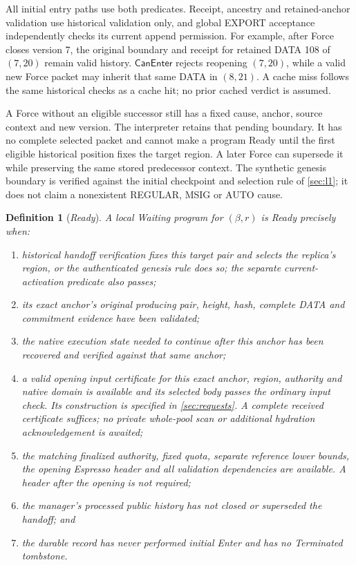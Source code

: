 \documentclass[11pt,a4paper]{article}
\newcommand{\tagg}[1]{\ensuremath{\mathsf{#1}}}
\newcommand{\defterm}[1]{\textcolor{rrBlue}{\textit{#1}}}
\newtheorem{definition}{Definition}[section]
\begin{document}
All initial entry paths use both predicates. Receipt, ancestry and
retained-anchor validation use historical validation only, and global
EXPORT acceptance independently checks its current append permission.
For example, after Force closes version 7, the original boundary and
receipt for retained DATA 108 of $(7,20)$ remain valid history.
$\tagg{CanEnter}$ rejects reopening $(7,20)$, while a valid new Force
packet may inherit that same DATA in $(8,21)$. A cache miss follows the
same historical checks as a cache hit; no prior cached verdict is assumed.

A Force without an eligible successor still has a fixed cause,
anchor, source context and new version. The interpreter retains that
pending boundary. It has no complete selected packet and cannot make
a program Ready until the first eligible historical position fixes
the target region. A later Force can supersede it while preserving the
same stored predecessor context. The synthetic genesis boundary is
verified against the initial checkpoint and selection rule of
\cref{sec:l1}; it does not claim a nonexistent REGULAR, MSIG or AUTO
cause.

\begin{definition}[\defterm{Ready}]
\label{def:ready}
A local Waiting program for $(\beta,r)$ is Ready precisely when:
\begin{enumerate}[label=(\roman*)]
\item historical handoff verification fixes this target pair and selects the
replica's region, or the authenticated genesis rule does so; the separate
current-activation predicate also passes;
\item its exact anchor's original producing pair, height, hash,
complete DATA and commitment evidence have been validated;
\item the native execution state needed to continue after this
anchor has been recovered and verified against that same anchor;
\item a valid opening input certificate for this exact anchor, region,
authority and native domain is available and its selected body passes
the ordinary input check. Its construction is specified in
\cref{sec:requests}. A complete received certificate suffices; no private
whole-pool scan or additional hydration acknowledgement is awaited;
\item the matching finalized authority, fixed quota, separate
reference lower bounds, the opening Espresso header and all validation
dependencies are available. A header after the opening is not required;
\item the manager's processed public history has not closed or
superseded the handoff; and
\item the durable record has never performed initial Enter and has
no Terminated tombstone.
\end{enumerate}
\end{definition}
\end{document}

